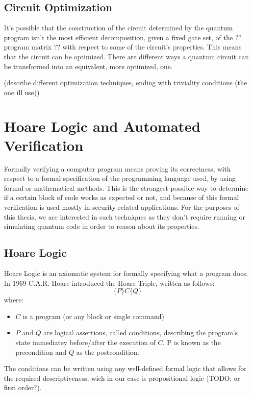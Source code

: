 \section{Circuit Optimization}
It's possible that the construction of the circuit determined by the quantum program isn't the most efficient decomposition, given a fixed gate set, of the ?? program matrix ?? with respect to some of the circuit's properties. This means that the circuit can be optimized. There are different ways a quantum circuit can be transformed into an equivalent, more optimized, one.

(describe different optimization techniques, ending with triviality conditions (the one ill use))

\chapter{Hoare Logic and Automated Verification}
Formally verifying a computer program means proving its correctness, with respect to a formal specification of the programming language used, by using formal or mathematical methods. This is the strongest possible way to determine if a certain block of code works as expected or not, and because of this formal verification is used mostly in security-related applications. For the purposes of this thesis, we are interested in such techniques as they don't require running or simulating quantum code in order to reason about its properties.

\section{Hoare Logic}
Hoare Logic is an axiomatic system for formally specifying what a program does. In 1969 C.A.R. Hoare introduced the Hoare Triple, written as follows:
\[
\{P\}C \{Q\}
\]
where:
\begin{itemize}
  \item $ C $ is a program (or any block or single command)
  \item $ P $ and $ Q $ are logical assertions, called conditions, describing the program's state immediatey before/after the execution of $ C $. P is known as the precondition and $ Q $ as the postcondition.
\end{itemize}

The conditions can be written using any well-defined formal logic that allows for the required descriptiveness, wich in our case is propositional logic (TODO: or first order?).

